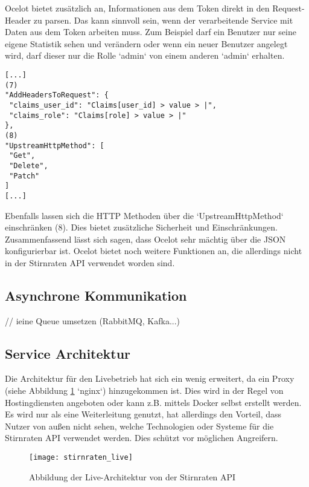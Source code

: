 Ocelot bietet zusätzlich an, Informationen aus dem Token direkt in den Request-Header zu parsen. Das kann sinnvoll sein, wenn der verarbeitende Service mit Daten aus dem Token arbeiten muss. Zum Beispiel darf ein Benutzer nur seine eigene Statistik sehen und verändern oder wenn ein neuer Benutzer angelegt wird, darf dieser nur die Rolle `admin` von einem anderen `admin` erhalten.  

\begin{verbatim}
[...]
(7)
"AddHeadersToRequest": {
 "claims_user_id": "Claims[user_id] > value > |",
 "claims_role": "Claims[role] > value > |"
},
(8)
"UpstreamHttpMethod": [
 "Get",
 "Delete",
 "Patch"
]
[...]
\end{verbatim}

Ebenfalls lassen sich die HTTP Methoden über die `UpstreamHttpMethod` einschränken (8). Dies bietet zusätzliche Sicherheit und Einschränkungen. \\

Zusammenfassend lässt sich sagen, dass Ocelot sehr mächtig über die JSON konfigurierbar ist. Ocelot bietet noch weitere Funktionen an, die allerdings nicht in der Stirnraten API verwendet worden sind.  

\subsection{Asynchrone  Kommunikation}
// ieine Queue umsetzen (RabbitMQ, Kafka...)

\subsection{Service Architektur}

Die Architektur für den Livebetrieb hat sich ein wenig erweitert, da ein Proxy (siehe Abbildung \ref{fig:stirnraten_live} `nginx`) hinzugekommen ist. Dies wird in der Regel von Hostingdiensten angeboten oder kann z.B. mittels Docker selbst erstellt werden. Es wird nur als eine Weiterleitung genutzt, hat allerdings den Vorteil, dass Nutzer von außen nicht sehen, welche Technologien oder Systeme für die Stirnraten API verwendet werden. Dies schützt vor möglichen Angreifern.

\begin{figure}[ht]
	\centering
	\texttt{[image: stirnraten\_live]}
	\caption[Stirnraten Live Architektur] {Abbildung der Live-Architektur von der Stirnraten API}
	\label{fig:stirnraten_live}
\end{figure} 

